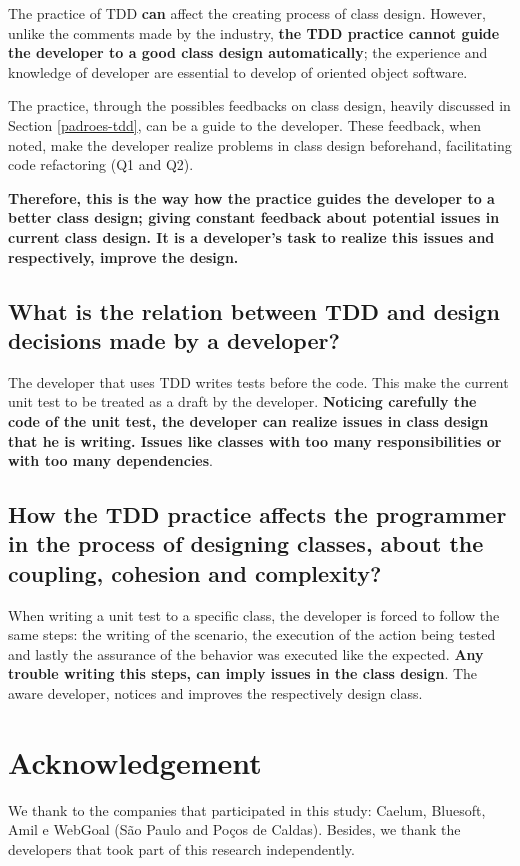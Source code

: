 \documentclass[conference]{IEEEtran}
\begin{document}
The practice of TDD \textbf{can} affect the creating process of class design. However,
unlike the comments made by the industry, \textbf{the TDD practice cannot guide the
developer to a good class design automatically}; the experience and knowledge of
developer are essential to develop of oriented object software.

The practice, through the possibles feedbacks on class design, heavily
discussed in Section \ref{padroes-tdd}, can be a guide to the developer.
These feedback, when noted, make the developer realize problems in class
design beforehand, facilitating code refactoring (Q1 and Q2).

\textbf{Therefore, this is the way how the practice guides the developer to
a better class design; giving constant feedback about potential issues in
current class design. It is a developer's task to realize this issues and
respectively, improve the design. }

\subsection{What is the relation between TDD and design decisions made by
a developer?}

The developer that uses TDD writes tests before the code. This make
the current unit test to be treated as a draft by the developer.
\textbf{Noticing carefully the code of the unit test, the developer can
realize issues in class design that he is writing. Issues like 
classes with too many responsibilities or with too many dependencies}.

\subsection{How the TDD practice affects the programmer in the process of designing
classes, about the coupling, cohesion and complexity?}

When writing a unit test to a specific class, the developer is forced to follow
the same steps: the writing of the scenario, the execution of the action being
tested and lastly the assurance of the behavior was executed like the
expected.
\textbf{Any trouble writing this steps, can imply issues in the class design}. 
The aware developer, notices and improves the respectively design class.

\section*{Acknowledgement}

We thank to the companies that participated in this study: Caelum, Bluesoft,
Amil e WebGoal (São Paulo and Poços de Caldas). Besides, we thank the
developers that took part of this research independently.


\footnotesize{}

\end{document}
